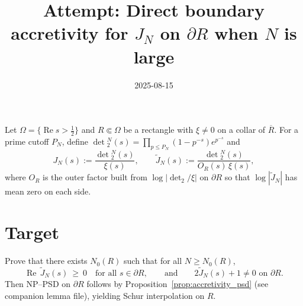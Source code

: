\documentclass[11pt]{article}
\title{Attempt: Direct boundary accretivity for $J_N$ on $\partial R$ when $N$ is large}
\date{2025-08-15}
\theoremstyle{remark}
\newcommand{\ReS}{\operatorname{Re}}
\begin{document}
\maketitle

Let $\Omega=\{\ReS s>\tfrac12\}$ and $R\Subset\Omega$ be a rectangle with $\xi\ne0$ on a collar of $\overline R$. For a prime cutoff $P_N$, define $\det{}_2^N(s)=\prod_{p\le P_N}(1-p^{-s})e^{p^{-s}}$ and
\[
J_N(s):=\frac{\det{}_2^N(s)}{\xi(s)},\qquad \widetilde J_N(s):=\frac{\det{}_2^N(s)}{O_R(s)\,\xi(s)},
\]
where $O_R$ is the outer factor built from $\log|\det_2/\xi|$ on $\partial R$ so that $\log|\widetilde J_N|$ has mean zero on each side.

\section*{Target}
Prove that there exists $N_0(R)$ such that for all $N\ge N_0(R)$,
\begin{equation}\label{eq:acc}
\ReS\,\widetilde J_N(s)\ \ge\ 0\quad \text{for all }s\in\partial R,\qquad \text{and}\qquad 2\widetilde J_N(s)+1\ne 0\text{ on }\partial R.
\end{equation}
Then NP--PSD on $\partial R$ follows by Proposition~\ref{prop:accretivity_psd} (see companion lemma file), yielding Schur interpolation on $R$.
\end{document}
